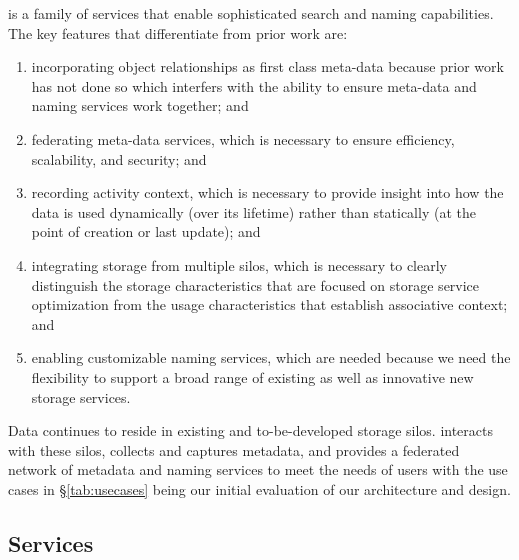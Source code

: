 
\emph{\system} is a family of services that enable sophisticated search and naming capabilities.
The key features that differentiate \emph{\system} from prior work are:

\begin{enumerate}[1)]
    \item incorporating object relationships as first class meta-data because
          prior work has not done so which interfers with the ability to ensure
          meta-data and naming services work together; and
    \item federating meta-data services, which is necessary to ensure
          efficiency, scalability, and security; and
    \item recording activity context, which is necessary to provide insight into
          how the data is used dynamically (over its lifetime) rather than statically
          (at the point of creation or last update); and
    \item integrating storage from multiple silos, which is necessary to clearly
          distinguish the storage characteristics that are focused on storage service
          optimization from the usage characteristics that establish associative
          context; and
    \item enabling customizable naming services, which are needed because we
          need the flexibility to support a broad range of existing as well as
          innovative new storage services.
\end{enumerate}

Data continues to reside in existing and to-be-developed storage silos.
\emph{\system} interacts with these silos, collects and captures metadata, and
provides a federated network of metadata and naming services to
meet the needs of users with the use cases in \S \ref{tab:usecases}
being our initial evaluation of our architecture and design.

\subsection{\emph{\system} Services}
\label{ch:model:sec:architecture:subsec:services}

